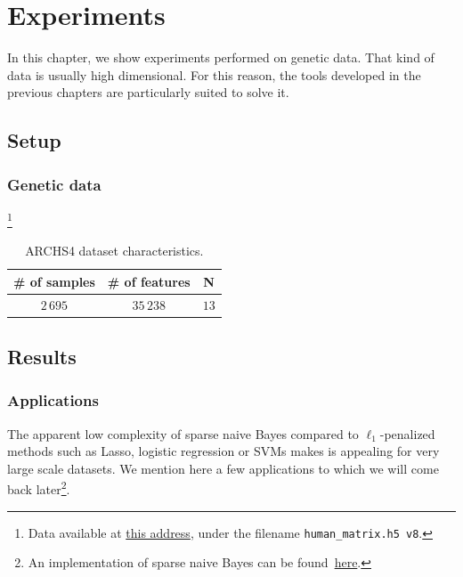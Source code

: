 \chapter{Experiments}\label{ch:exp}

In this chapter,
we show experiments performed on genetic data.
That kind of data is usually high dimensional.
For this reason, the tools developed in the previous chapters are particularly suited to solve it.

\section{Setup}\label{sec:exp_setup}

\subsection{Genetic data}\label{subsec:genetic_data}

\footnote{
    Data available at \href{https://amp.pharm.mssm.edu/archs4/download.html}{this address},
    under the filename \texttt{human\_matrix.h5 v8}.
}

\begin{table}[!htb]
    \centering
    \setlength{\tabcolsep}{2pt}
    {\small
        \begin{tabular}{|c|c|c|}\hline
        \textbf{\# of samples} & \textbf{\# of features} & \textbf{N}\\ \hline
        $2\,695$ & $35\,238$  & $13$\\ \hline
        \end{tabular}
    }%
    \caption[short]{
        ARCHS4 dataset characteristics.
    }
    \label{tab:archs4_dataset}
\end{table}

\section{Results}\label{sec:exp_results}

\subsection{Applications}\label{subsec:nb_app}

The apparent low complexity of sparse naive Bayes compared to $\ell_1$-penalized methods such as
Lasso, logistic regression or SVMs makes is appealing for very large scale datasets.
We mention here a few applications to which we will come back later\footnote{
    An implementation of sparse naive Bayes can be found~\href{https://github.com/aspremon/NaiveFeatureSelection}{here}.
}.

